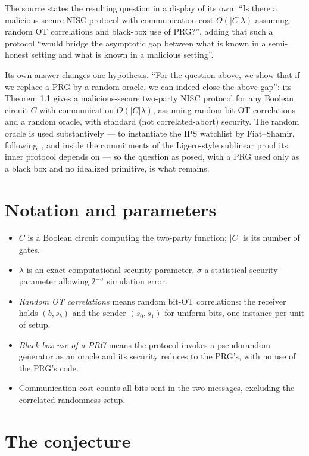 \documentclass{aicr-conjecture}
\begin{document}
The source states the resulting question in a display of its own:
``Is there a malicious-secure NISC protocol with communication cost
$O(|C|\lambda)$ assuming random OT correlations and black-box use of
PRG?'', adding that such a protocol ``would bridge the asymptotic gap
between what is known in a semi-honest setting and what is known in a
malicious setting''.

Its own answer changes one hypothesis. ``For the question above, we show
that if we replace a PRG by a random oracle, we can indeed close the
above gap'': its Theorem 1.1 gives a malicious-secure two-party NISC
protocol for any Boolean circuit $C$ with communication $O(|C|\lambda)$,
assuming random bit-OT correlations and a random oracle, with standard
(not correlated-abort) security. The random oracle is used substantively
--- to instantiate the IPS watchlist by Fiat--Shamir, following~\cite{IKSS22a}, and inside the commitments of the Ligero-style
sublinear proof its inner protocol depends on --- so the question as
posed, with a PRG used only as a black box and no idealized primitive,
is what remains.

\section{Notation and parameters}\label{sec:notation}

\begin{itemize}[nosep]
  \item $C$ is a Boolean circuit computing the two-party function; $|C|$
    is its number of gates.
  \item $\lambda$ is an exact computational security parameter, $\sigma$
    a statistical security parameter allowing $2^{-\sigma}$ simulation
    error.
  \item \emph{Random OT correlations} means random bit-OT correlations:
    the receiver holds $(b, s_{b})$ and the sender $(s_{0}, s_{1})$ for
    uniform bits, one instance per unit of setup.
  \item \emph{Black-box use of a PRG} means the protocol invokes a
    pseudorandom generator as an oracle and its security reduces to the
    PRG's, with no use of the PRG's code.
  \item Communication cost counts all bits sent in the two messages,
    excluding the correlated-randomness setup.
\end{itemize}

\section{The conjecture}\label{sec:conjectures}
\end{document}
